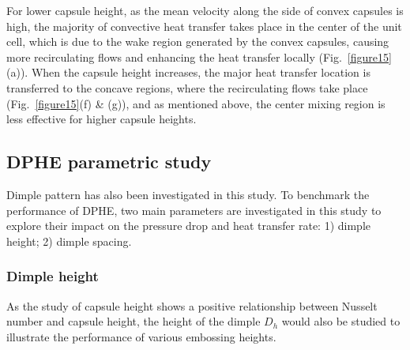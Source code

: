\documentclass[review,12pt]{elsarticle}
\begin{document}
For lower capsule height, as the mean velocity along the side of convex capsules is high, the majority of convective heat transfer takes place in the center of the unit cell, which is due to the wake region generated by the convex capsules, causing more recirculating flows and enhancing the heat transfer locally (Fig.~\ref{figure15}(a)). When the capsule height increases, the major heat transfer location is transferred to the concave regions, where the recirculating flows take place (Fig.~\ref{figure15}(f) \& (g)), and as mentioned above, the center mixing region is less effective for higher capsule heights.

\clearpage

\subsection{DPHE parametric study}
\label{sec:dphe_results}

Dimple pattern has also been investigated in this study. To benchmark the performance of DPHE, two main parameters are investigated in this study to explore their impact on the pressure drop and heat transfer rate: 1) dimple height; 2) dimple spacing.

\subsubsection{Dimple height}
\label{sec:dimple_height_results}

As the study of capsule height shows a positive relationship between Nusselt number and capsule height, the height of the dimple $D_h$ would also be studied to illustrate the performance of various embossing heights.
\end{document}
